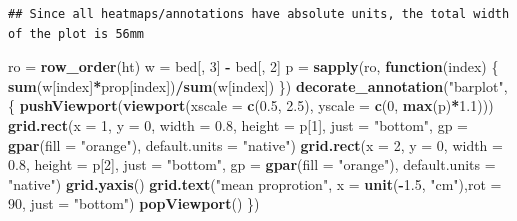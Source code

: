 \documentclass[]{book}
\newenvironment{Shaded}{\begin{snugshade}}{\end{snugshade}}
\newcommand{\KeywordTok}[1]{\textcolor[rgb]{0.13,0.29,0.53}{\textbf{#1}}}
\newcommand{\DataTypeTok}[1]{\textcolor[rgb]{0.13,0.29,0.53}{#1}}
\newcommand{\DecValTok}[1]{\textcolor[rgb]{0.00,0.00,0.81}{#1}}
\newcommand{\FloatTok}[1]{\textcolor[rgb]{0.00,0.00,0.81}{#1}}
\newcommand{\StringTok}[1]{\textcolor[rgb]{0.31,0.60,0.02}{#1}}
\newcommand{\ControlFlowTok}[1]{\textcolor[rgb]{0.13,0.29,0.53}{\textbf{#1}}}
\newcommand{\OperatorTok}[1]{\textcolor[rgb]{0.81,0.36,0.00}{\textbf{#1}}}
\newcommand{\NormalTok}[1]{#1}
\theoremstyle{definition}
\theoremstyle{definition}
\theoremstyle{definition}
\theoremstyle{remark}
\begin{document}
\begin{verbatim}
## Since all heatmaps/annotations have absolute units, the total width of the plot is 56mm
\end{verbatim}

\begin{Shaded}
\begin{Highlighting}[]
\NormalTok{ro =}\StringTok{ }\KeywordTok{row_order}\NormalTok{(ht)}
\NormalTok{w =}\StringTok{ }\NormalTok{bed[, }\DecValTok{3}\NormalTok{] }\OperatorTok{-}\StringTok{ }\NormalTok{bed[, }\DecValTok{2}\NormalTok{]}
\NormalTok{p =}\StringTok{ }\KeywordTok{sapply}\NormalTok{(ro, }\ControlFlowTok{function}\NormalTok{(index) \{}
    \KeywordTok{sum}\NormalTok{(w[index]}\OperatorTok{*}\NormalTok{prop[index])}\OperatorTok{/}\KeywordTok{sum}\NormalTok{(w[index])}
\NormalTok{\})}
\KeywordTok{decorate_annotation}\NormalTok{(}\StringTok{"barplot"}\NormalTok{, \{}
    \KeywordTok{pushViewport}\NormalTok{(}\KeywordTok{viewport}\NormalTok{(}\DataTypeTok{xscale =} \KeywordTok{c}\NormalTok{(}\FloatTok{0.5}\NormalTok{, }\FloatTok{2.5}\NormalTok{), }\DataTypeTok{yscale =} \KeywordTok{c}\NormalTok{(}\DecValTok{0}\NormalTok{, }\KeywordTok{max}\NormalTok{(p)}\OperatorTok{*}\FloatTok{1.1}\NormalTok{)))}
    \KeywordTok{grid.rect}\NormalTok{(}\DataTypeTok{x =} \DecValTok{1}\NormalTok{, }\DataTypeTok{y =} \DecValTok{0}\NormalTok{, }\DataTypeTok{width =} \FloatTok{0.8}\NormalTok{, }\DataTypeTok{height =}\NormalTok{ p[}\DecValTok{1}\NormalTok{], }\DataTypeTok{just =} \StringTok{"bottom"}\NormalTok{,}
        \DataTypeTok{gp =} \KeywordTok{gpar}\NormalTok{(}\DataTypeTok{fill =} \StringTok{"orange"}\NormalTok{), }\DataTypeTok{default.units =} \StringTok{"native"}\NormalTok{)}
    \KeywordTok{grid.rect}\NormalTok{(}\DataTypeTok{x =} \DecValTok{2}\NormalTok{, }\DataTypeTok{y =} \DecValTok{0}\NormalTok{, }\DataTypeTok{width =} \FloatTok{0.8}\NormalTok{, }\DataTypeTok{height =}\NormalTok{ p[}\DecValTok{2}\NormalTok{], }\DataTypeTok{just =} \StringTok{"bottom"}\NormalTok{,}
        \DataTypeTok{gp =} \KeywordTok{gpar}\NormalTok{(}\DataTypeTok{fill =} \StringTok{"orange"}\NormalTok{), }\DataTypeTok{default.units =} \StringTok{"native"}\NormalTok{)}
    \KeywordTok{grid.yaxis}\NormalTok{()}
    \KeywordTok{grid.text}\NormalTok{(}\StringTok{"mean proprotion"}\NormalTok{, }\DataTypeTok{x =} \KeywordTok{unit}\NormalTok{(}\OperatorTok{-}\FloatTok{1.5}\NormalTok{, }\StringTok{"cm"}\NormalTok{),}\DataTypeTok{rot =} \DecValTok{90}\NormalTok{, }\DataTypeTok{just =} \StringTok{"bottom"}\NormalTok{)}
    \KeywordTok{popViewport}\NormalTok{()}
\NormalTok{\})}
\end{Highlighting}
\end{Shaded}
\end{document}
